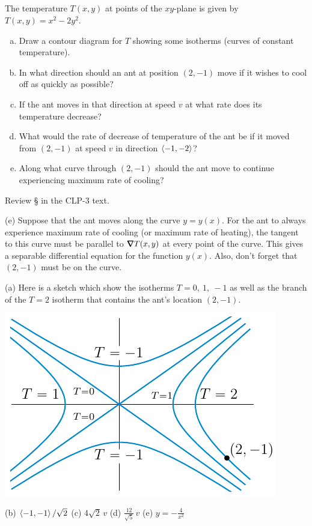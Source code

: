 \subsection*{\Application}

\begin{question}
The temperature $T(x,y)$ at points of the $xy$-plane is given by 
$T(x,y)=x^2-2y^2$.
\begin{enumerate}[(a)]
\item
Draw a contour diagram for $T$ showing some isotherms (curves
of constant temperature).
\item
In what direction should an ant at position $(2,-1)$ move if
it wishes to cool off as quickly as possible?
\item
If the ant moves in that direction at speed $v$ at what rate
does its temperature decrease?
\item
What would the rate of decrease of temperature of the ant be
if it moved from $(2,-1)$ at speed $v$ in direction $\left< -1,-2\right>$?
\item
Along what curve through $(2,-1)$ should the ant move to continue
experiencing maximum rate of cooling?
\end{enumerate}
\end{question}

\begin{hint}
Review \S{} in the CLP-3 text.

(e) Suppose that the ant moves along the curve $y=y(x)$. 
For the ant to always experience maximum rate of cooling (or maximum 
rate of heating), the tangent to this curve must be parallel to 
$\vnabla T(x,y)$ at every point of the curve. This gives a separable
differential equation for the function $y(x)$. Also, don't forget that $(2,-1)$ must be on the curve.
\end{hint}

\begin{answer}
(a) Here is a sketch which show the isotherms $T=0,\ 1,\ -1$ as well
as the branch of the $T=2$ isotherm that contains the ant's location
$(2,-1)$.
\begin{center}
     \includegraphics{fig/ant.pdf}
\end{center}

(b) $\left< -1,-1\right>/\sqrt{2}$\qquad
(c) $4\sqrt{2}\,v$\qquad
(d) $\frac{12}{\sqrt{5}}\,v$\qquad
(e) $y=-\frac{4}{x^2}$
\end{answer}

